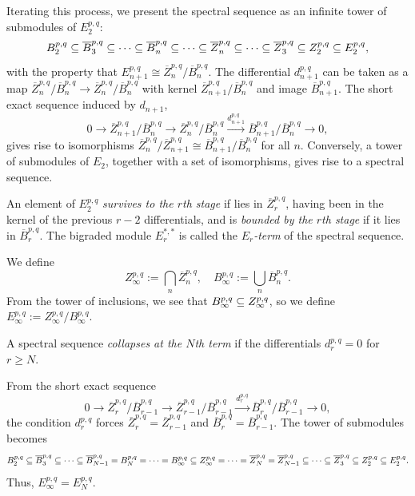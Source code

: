 \documentclass{MetricNotes2023}
\def\subq{\ensuremath\subseteq}
\begin{document}
Iterating this process, we present the spectral sequence as an infinite tower of submodules of \(E_2^{p,q}\):
\[B_2^{p,q}\subq \overline B_3^{p,q}\subq \cdots \subq \overline B_n^{p,q}\subq \cdots \subq \overline Z_n^{p,q}\subq \cdots \subq \overline Z_3^{p,q}\subq Z_2^{p,q}\subq E_2^{p,q},\]
with the property that \(E^{p,q}_{n+1}\cong \overline Z_n^{p,q}/\overline B_n^{p,q}\). The differential \(d_{n+1}^{p,q}\) can be taken as a map \(\overline Z^{p,q}_n/\overline B_n^{p,q}\to\overline Z_n^{p,q}/\overline B_n^{p,q}\) with kernel \(\overline Z_{n+1}^{p,q}/\overline B_n^{p,q}\) and image \(\overline B_{n+1}^{p,q}\). The short exact sequence induced by \(d_{n+1}\),
\[0 \to \overline Z^{p,q}_{n+1}/\overline B_n^{p,q}\to \overline Z_n^{p,q}/\overline B_n^{p,q} \xrightarrow{d_{n+1}^{p,q}} \overline B_{n+1}^{p,q}/\overline{B}_n^{p,q}\to 0,\]
gives rise to isomorphisms \(\overline{Z}_n^{p,q}/\overline{Z}_{n+1}^{p,q}\cong \overline{B}_{n+1}^{p,q}/\overline{B}_n ^{p,q}\) for all \(n\). Conversely, a tower of submodules of \(E_2\), together with a set of isomorphisms, gives rise to a spectral sequence. 

\begin{definition}
An element of \(E_2^{p,q}\) \textit{survives to the \(r\)th stage} if lies in \(\overline{Z}_r^{p,q}\), having been in the kernel of the previous \(r-2\) differentials, and is \textit{bounded by the \(r\)th stage} if it lies in \(\overline{B}_r^{p,q}\). The bigraded module \(E_r^{*,*}\) is called the \textit{\(E_r\)-term} of the spectral sequence. 
\end{definition}

We define 
\[Z_\infty^{p,q}:= \bigcap_n \overline{Z}^{p,q}_n, \quad B_\infty^{p,q}:=\bigcup_n \overline{B}^{p,q}_n.\]
From the tower of inclusions, we see that \(B_\infty^{p,q}\subq Z^{p,q}_\infty\), so we define \(E_\infty^{p,q}:=Z_\infty^{p,q}/B_\infty^{p,q}\). 

\begin{definition}
A spectral sequence \textit{collapses at the \(N\)th term} if the differentials \(d_r^{p,q}=0\) for \(r\geq N\). 
\end{definition}

From the short exact sequence 
\[0 \to \overline Z^{p,q}_{r}/\overline B_{r-1}^{p,q}\to \overline Z_{r-1}^{p,q}/\overline B_{r-1}^{p,q} \xrightarrow{d_{r}^{p,q}} \overline B_{r}^{p,q}/\overline{B}_{r-1}^{p,q}\to 0,\]
the condition \(d_r^{p,q}\) forces  \(\overline{Z}^{p,q}_r=\overline{Z}_{r-1}^{p,q}\) and \(\overline{B}^{p,q}_r=\overline{B}_{r-1}^{p,q}\). The tower of submodules becomes
\[B_2^{p,q}\subq \overline B_3^{p,q}\subq \cdots \subq \overline B_{N-1}^{p,q}=B_N^{p,q}= \cdots=B_\infty^{p,q} \subq Z_\infty^{p,q}= \cdots = \overline Z_N^{p,q}=\overline Z^{p,q}_{N-1}\subq \cdots \subq \overline Z_3^{p,q}\subq Z_2^{p,q}\subq E_2^{p,q}.\]
Thus, \(E_\infty^{p,q}=E_N^{p,q}\). 
\end{document}
